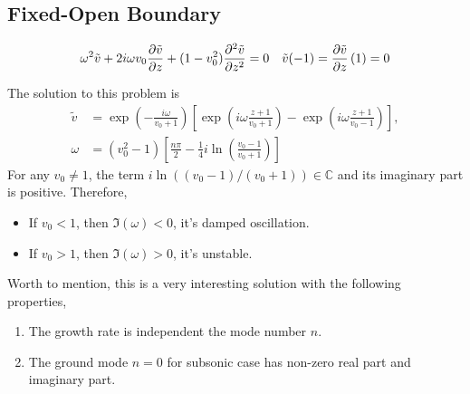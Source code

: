 \subsection{Fixed-Open Boundary}

\begin{equation} \label{eq:constant_v_problem_fixed_open}
	\omega^2\tilde{v} + 2i\omega v_0\pdv{\tilde{v}}{z} + (1-v_0^2)\pdv[2]{\tilde{v}}{z} = 0
	\quad
	\tilde{v}(-1) = \pdv{\tilde{v}}{z}\,(1) = 0
\end{equation}

The solution to this problem is
\begin{equation} \label{eq:constant_v_solution_fixed_open}
	\begin{aligned}
		\tilde{v} &= \exp\left(-\frac{i\omega}{v_0+1}\right)
		\left[ \exp\left(i\omega\frac{z+1}{v_0+1}\right) - \exp\left(i\omega\frac{z+1}{v_0-1}\right) \right], \\
		\omega &= (v_0^2 - 1) \left[\frac{n\pi}{2} - \frac{1}{4}i\ln(\frac{v_0-1}{v_0+1})\right]
	\end{aligned}
\end{equation}
For any $v_0\neq 1$, the term $i\ln((v_0-1)/(v_0+1))\in\mathbb{C}$ and its imaginary part is positive. Therefore,
\begin{itemize}
	\item If $v_0<1$, then $\Im(\omega)<0$, it's damped oscillation.
	\item If $v_0>1$, then $\Im(\omega)>0$, it's unstable.
\end{itemize}

Worth to mention, this is a very interesting solution with the following properties,
\begin{enumerate}
	\item The growth rate is independent the mode number $n$.
	\item The ground mode $n=0$ for subsonic case has non-zero real part and imaginary part.
\end{enumerate}

